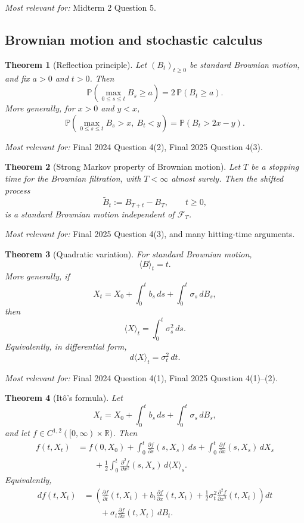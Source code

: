 \documentclass[11pt]{article}
\newtheorem{theorem}{Theorem}[section]
\theoremstyle{definition}
\begin{document}
\emph{Most relevant for:} Midterm 2 Question 5.

\subsection{Brownian motion and stochastic calculus}

\begin{theorem}[Reflection principle]
Let $(B_t)_{t\ge 0}$ be standard Brownian motion, and fix $a>0$ and $t>0$. Then
\[
\mathbb P\!\left(\max_{0\le s\le t} B_s \ge a\right)
= 2\,\mathbb P(B_t\ge a).
\]
More generally, for $x>0$ and $y<x$,
\[
\mathbb P\!\left(\max_{0\le s\le t} B_s > x,\ B_t<y\right)
=
\mathbb P(B_t>2x-y).
\]
\end{theorem}

\emph{Most relevant for:} Final 2024 Question 4(2), Final 2025 Question 4(3).

\begin{theorem}[Strong Markov property of Brownian motion]
Let $T$ be a stopping time for the Brownian filtration, with $T<\infty$ almost surely. Then the shifted process
\[
\widetilde B_t := B_{T+t}-B_T,
\qquad t\ge 0,
\]
is a standard Brownian motion independent of $\mathcal F_T$.
\end{theorem}

\emph{Most relevant for:} Final 2025 Question 4(3), and many hitting-time arguments.

\begin{theorem}[Quadratic variation]
For standard Brownian motion,
\[
\langle B\rangle_t = t.
\]
More generally, if
\[
X_t = X_0 + \int_0^t b_s\,ds + \int_0^t \sigma_s\,dB_s,
\]
then
\[
\langle X\rangle_t = \int_0^t \sigma_s^2\,ds.
\]
Equivalently, in differential form,
\[
d\langle X\rangle_t = \sigma_t^2\,dt.
\]
\end{theorem}

\emph{Most relevant for:} Final 2024 Question 4(1), Final 2025 Question 4(1)--(2).

\begin{theorem}[It\^o's formula]
Let
\[
X_t = X_0 + \int_0^t b_s\,ds + \int_0^t \sigma_s\,dB_s,
\]
and let $f\in C^{1,2}([0,\infty)\times\mathbb R)$. Then
\[
\begin{aligned}
f(t,X_t)
&= f(0,X_0)
+ \int_0^t \frac{\partial f}{\partial s}(s,X_s)\,ds
+ \int_0^t \frac{\partial f}{\partial x}(s,X_s)\,dX_s \\
&\qquad
+ \frac12 \int_0^t \frac{\partial^2 f}{\partial x^2}(s,X_s)\,d\langle X\rangle_s.
\end{aligned}
\]
Equivalently,
\[
\begin{aligned}
df(t,X_t)
&=
\left(
\frac{\partial f}{\partial t}(t,X_t)
+ b_t\frac{\partial f}{\partial x}(t,X_t)
+ \frac12 \sigma_t^2 \frac{\partial^2 f}{\partial x^2}(t,X_t)
\right)dt \\
&\qquad + \sigma_t\frac{\partial f}{\partial x}(t,X_t)\,dB_t.
\end{aligned}
\]
\end{theorem}
\end{document}
